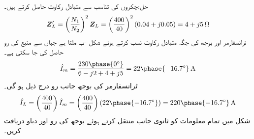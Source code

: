 حل:چکروں کی تناسب سے متبادل رکاوٹ حاصل کرتے ہیں۔
\begin{align*}
{\ensuremath{{\boldsymbol{Z}}}}_L'=\left(\frac{N_1}{N_2}\right)^2{{\boldsymbol{Z}}}_L=\left(\frac{400}{40}\right)^2 (0.04+j0.05)=4+j5 \, \si{\ohm}
\end{align*}
ٹرانسفارمر اور بوجھ کی جگہ متبادل رکاوٹ نسب کرتے ہوئے شکل -ب ملتا ہے جہاں سے منبع کی رو حاصل کی جا سکتی ہے۔
\begin{align*}
\hat{I}_m=\frac{230\phase{0^{\circ}}}{6-j2+4+j5}=22\phase{-16.7^{\circ}}\,\si{\ampere}
\end{align*}
ٹرانسفارمر کی بوجھ جانب رو درج ذیل ہو گی۔
\begin{align*}
\hat{I}_L=\left(\frac{400}{40}\right)\hat{I}_m=\left(\frac{400}{40}\right)(22\phase{-16.7^{\circ}})=220\phase{-16.7^{\circ}} \, \si{\ampere}
\end{align*}
شکل  میں تمام معلومات کو ثانوی جانب منتقل کرتے ہوئے بوجھ کی رو اور دباو دریافت کریں۔

